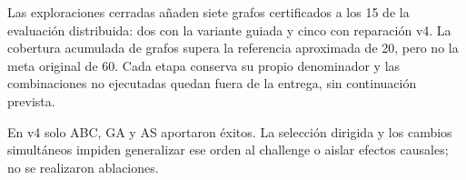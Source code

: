 Las exploraciones cerradas añaden siete grafos certificados a los 15 de la evaluación distribuida: dos con la variante guiada y cinco con reparación v4. La cobertura acumulada de \UnionCertifiedGraphs{} grafos supera la referencia aproximada de 20, pero no la meta original de 60. Cada etapa conserva su propio denominador y las combinaciones no ejecutadas quedan fuera de la entrega, sin continuación prevista.

En v4 solo ABC, GA y AS aportaron éxitos. La selección dirigida y los cambios simultáneos impiden generalizar ese orden al challenge o aislar efectos causales; no se realizaron ablaciones.
